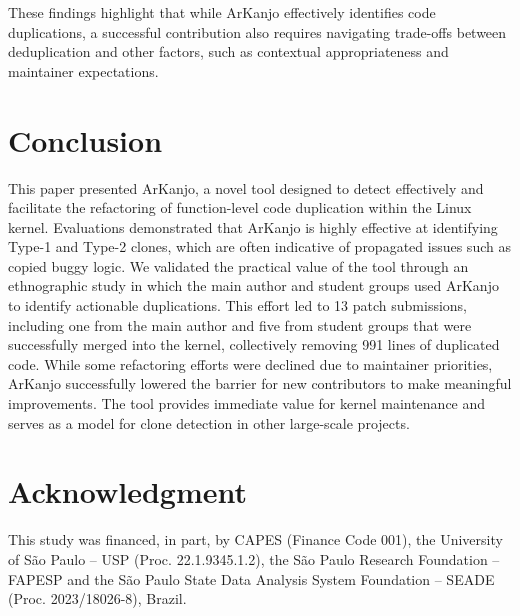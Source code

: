 \documentclass[conference]{IEEEtran}
\begin{document}
These findings highlight that while ArKanjo effectively identifies code duplications, a successful 
contribution also requires navigating trade-offs between deduplication and other factors, such as 
contextual appropriateness and maintainer expectations.


\section{Conclusion}

This paper presented ArKanjo, a novel tool designed to detect effectively 
and facilitate the refactoring of function-level code duplication within the Linux kernel. 
Evaluations demonstrated that ArKanjo is highly effective at identifying Type-1 and Type-2 
clones, which are often indicative of propagated issues such as copied buggy logic. We validated the practical 
value of the tool through an ethnographic study in which the main author and student 
groups used ArKanjo to identify actionable duplications. This effort led to 13 patch submissions, 
including one from the main author and five from student groups that were successfully merged into 
the kernel, collectively removing 991 lines of duplicated code. While some refactoring 
efforts were declined due to maintainer priorities, ArKanjo successfully lowered the barrier 
for new contributors to make meaningful improvements. The tool provides immediate value for 
kernel maintenance and serves as a model for clone detection in other large-scale projects.

\section*{Acknowledgment}

This study was financed, in part, by CAPES (Finance Code 001), the University of São Paulo – USP (Proc. 22.1.9345.1.2), the São Paulo Research Foundation – FAPESP and the São Paulo State Data Analysis System Foundation – SEADE (Proc. 2023/18026-8), Brazil.

\newpage


\end{document}
